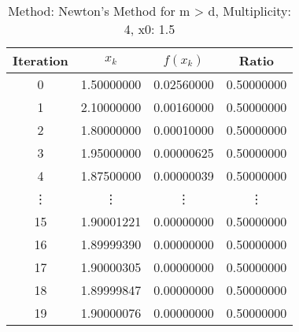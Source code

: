 \begin{table}
\centering
\caption{Method: Newton's Method for m > d, Multiplicity: 4, x0: 1.5}
\label{tab:table_Newton's_Method_for_m_>_d_4_1_5}
\begin{tabular}{c c c c}
\toprule
Iteration &      $x_k$ &   $f(x_k)$ &      Ratio \\
\midrule
        0 & 1.50000000 & 0.02560000 & 0.50000000 \\
        1 & 2.10000000 & 0.00160000 & 0.50000000 \\
        2 & 1.80000000 & 0.00010000 & 0.50000000 \\
        3 & 1.95000000 & 0.00000625 & 0.50000000 \\
        4 & 1.87500000 & 0.00000039 & 0.50000000 \\
   \vdots &     \vdots &     \vdots &     \vdots \\
       15 & 1.90001221 & 0.00000000 & 0.50000000 \\
       16 & 1.89999390 & 0.00000000 & 0.50000000 \\
       17 & 1.90000305 & 0.00000000 & 0.50000000 \\
       18 & 1.89999847 & 0.00000000 & 0.50000000 \\
       19 & 1.90000076 & 0.00000000 & 0.50000000 \\
\bottomrule
\end{tabular}
\end{table}
